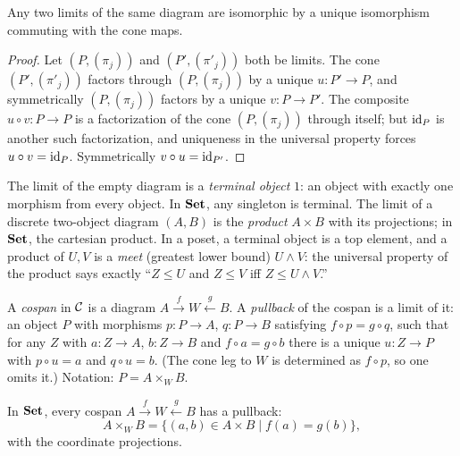 \begin{proposition}\label{ch02:prop:limit-unique}
Any two limits of the same diagram are isomorphic by a unique
isomorphism commuting with the cone maps.
\end{proposition}

\begin{proof}
Let $(P, (\pi_j))$ and $(P', (\pi'_j))$ both be limits. The cone
$(P', (\pi'_j))$ factors through $(P, (\pi_j))$ by a unique
$u : P' \to P$, and symmetrically $(P, (\pi_j))$ factors by a unique
$v : P \to P'$. The composite $u \circ v : P \to P$ is a factorization
of the cone $(P, (\pi_j))$ through itself; but $\mathrm{id}_P$ is another such
factorization, and uniqueness in the universal property forces
$u \circ v = \mathrm{id}_P$. Symmetrically $v \circ u = \mathrm{id}_{P'}$.
\end{proof}

\begin{example}\label{ch02:ex:terminal-product}
The limit of the empty diagram is a \emph{terminal object} $1$: an
object with exactly one morphism from every object. In $\mathbf{Set}$, any
singleton is terminal. The limit of a discrete two-object diagram
$(A, B)$ is the \emph{product} $A \times B$ with its projections; in
$\mathbf{Set}$, the cartesian product. In a poset, a terminal object is a top
element, and a product of $U, V$ is a \emph{meet} (greatest lower
bound) $U \wedge V$: the universal property of the product says
exactly ``$Z \le U$ and $Z \le V$ iff $Z \le U \wedge V$.''
\end{example}

\begin{definition}[Pullback]\label{ch02:def:pullback}
A \emph{cospan} in $\mathcal{C}$ is a diagram
$A \xrightarrow{\,f\,} W \xleftarrow{\,g\,} B$. A \emph{pullback} of
the cospan is a limit of it: an object $P$ with morphisms
$p : P \to A$, $q : P \to B$ satisfying $f \circ p = g \circ q$, such
that for any $Z$ with $a : Z \to A$, $b : Z \to B$ and
$f \circ a = g \circ b$ there is a unique $u : Z \to P$ with
$p \circ u = a$ and $q \circ u = b$. (The cone leg to $W$ is
determined as $f \circ p$, so one omits it.) Notation:
$P = A \times_W B$.
\end{definition}

\begin{proposition}\label{ch02:prop:pullback-set}
In $\mathbf{Set}$, every cospan $A \xrightarrow{f} W \xleftarrow{g} B$ has a
pullback:
\[
A \times_W B = \{(a, b) \in A \times B \mid f(a) = g(b)\},
\]
with the coordinate projections.
\end{proposition}

